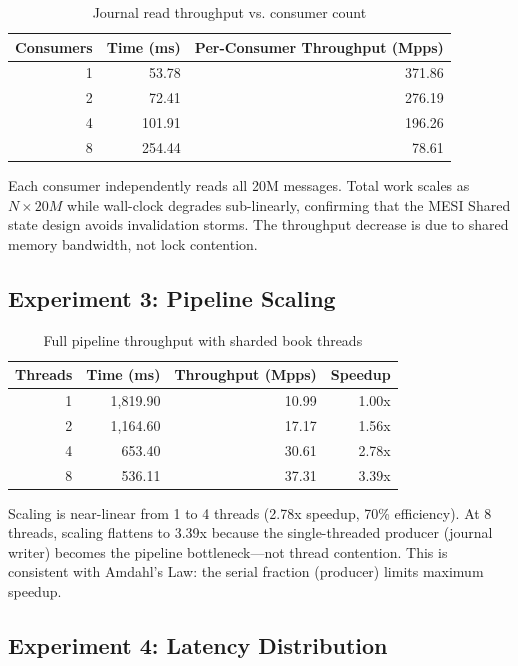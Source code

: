 \documentclass[conference]{IEEEtran}
\begin{document}
\begin{table}[H]
\centering
\caption{Journal read throughput vs. consumer count}
\begin{tabular}{rrr}
\toprule
Consumers & Time (ms) & Per-Consumer Throughput (Mpps) \\
\midrule
1 & 53.78 & 371.86 \\
2 & 72.41 & 276.19 \\
4 & 101.91 & 196.26 \\
8 & 254.44 & 78.61 \\
\bottomrule
\end{tabular}
\label{tab:journal}
\end{table}

Each consumer independently reads all 20M messages. Total work scales as $N \times 20M$ while wall-clock degrades sub-linearly, confirming that the MESI Shared state design avoids invalidation storms. The throughput decrease is due to shared memory bandwidth, not lock contention.

\subsection{Experiment 3: Pipeline Scaling}

\begin{table}[H]
\centering
\caption{Full pipeline throughput with sharded book threads}
\begin{tabular}{rrrr}
\toprule
Threads & Time (ms) & Throughput (Mpps) & Speedup \\
\midrule
1 & 1,819.90 & 10.99 & 1.00x \\
2 & 1,164.60 & 17.17 & 1.56x \\
4 & 653.40 & 30.61 & 2.78x \\
8 & 536.11 & 37.31 & 3.39x \\
\bottomrule
\end{tabular}
\label{tab:pipeline}
\end{table}

Scaling is near-linear from 1 to 4 threads (2.78x speedup, 70\% efficiency). At 8 threads, scaling flattens to 3.39x because the single-threaded producer (journal writer) becomes the pipeline bottleneck---not thread contention. This is consistent with Amdahl's Law: the serial fraction (producer) limits maximum speedup.

\subsection{Experiment 4: Latency Distribution}
\end{document}
